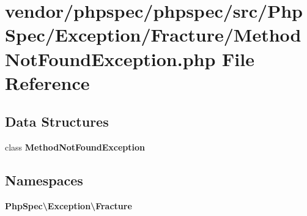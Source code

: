 \section{vendor/phpspec/phpspec/src/\+Php\+Spec/\+Exception/\+Fracture/\+Method\+Not\+Found\+Exception.php File Reference}
\label{phpspec_2src_2_php_spec_2_exception_2_fracture_2_method_not_found_exception_8php}
\subsection*{Data Structures}
\begin{DoxyCompactItemize}
\item 
class {\bf Method\+Not\+Found\+Exception}
\end{DoxyCompactItemize}
\subsection*{Namespaces}
\begin{DoxyCompactItemize}
\item 
 {\bf Php\+Spec\textbackslash{}\+Exception\textbackslash{}\+Fracture}
\end{DoxyCompactItemize}
